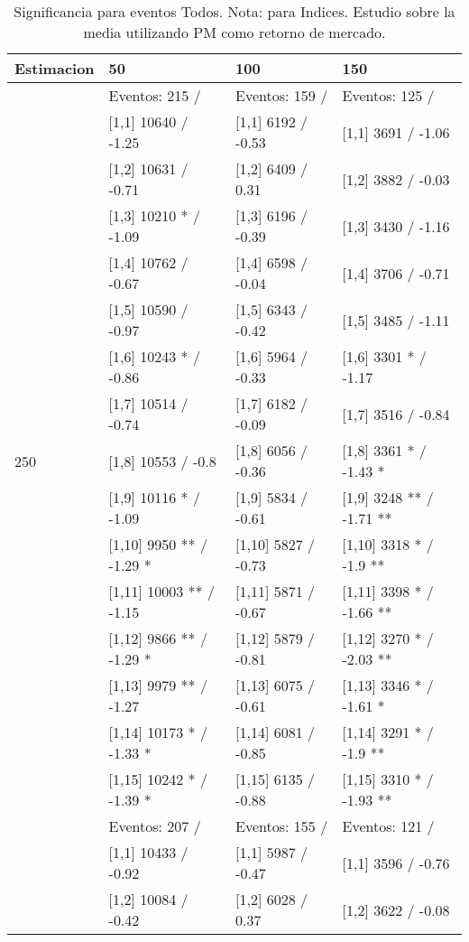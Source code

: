 \begin{table}

\caption{Significancia para eventos Todos. Nota: para Indices. Estudio sobre la media utilizando PM como retorno de mercado.}
\centering
\begin{tabular}[t]{llll}
\toprule
Estimacion & 50 & 100 & 150\\
\midrule
 & Eventos:  215 / & Eventos:  159 / & Eventos:  125 /\\
 & {}[1,1] 10640  / -1.25 & {}[1,1] 6192  / -0.53 & {}[1,1] 3691  / -1.06\\
 & {}[1,2] 10631  / -0.71 & {}[1,2] 6409  / 0.31 & {}[1,2] 3882  / -0.03\\
 & {}[1,3] 10210 * / -1.09 & {}[1,3] 6196  / -0.39 & {}[1,3] 3430  / -1.16\\
 & {}[1,4] 10762  / -0.67 & {}[1,4] 6598  / -0.04 & {}[1,4] 3706  / -0.71\\
\addlinespace
 & {}[1,5] 10590  / -0.97 & {}[1,5] 6343  / -0.42 & {}[1,5] 3485  / -1.11\\
 & {}[1,6] 10243 * / -0.86 & {}[1,6] 5964  / -0.33 & {}[1,6] 3301 * / -1.17\\
 & {}[1,7] 10514  / -0.74 & {}[1,7] 6182  / -0.09 & {}[1,7] 3516  / -0.84\\
250 & {}[1,8] 10553  / -0.8 & {}[1,8] 6056  / -0.36 & {}[1,8] 3361 * / -1.43 *\\
 & {}[1,9] 10116 * / -1.09 & {}[1,9] 5834  / -0.61 & {}[1,9] 3248 ** / -1.71 **\\
\addlinespace
 & {}[1,10] 9950 ** / -1.29 * & {}[1,10] 5827  / -0.73 & {}[1,10] 3318 * / -1.9 **\\
 & {}[1,11] 10003 ** / -1.15 & {}[1,11] 5871  / -0.67 & {}[1,11] 3398 * / -1.66 **\\
 & {}[1,12] 9866 ** / -1.29 * & {}[1,12] 5879  / -0.81 & {}[1,12] 3270 * / -2.03 **\\
 & {}[1,13] 9979 ** / -1.27 & {}[1,13] 6075  / -0.61 & {}[1,13] 3346 * / -1.61 *\\
 & {}[1,14] 10173 * / -1.33 * & {}[1,14] 6081  / -0.85 & {}[1,14] 3291 * / -1.9 **\\
\addlinespace
 & {}[1,15] 10242 * / -1.39 * & {}[1,15] 6135  / -0.88 & {}[1,15] 3310 * / -1.93 **\\
 & Eventos:  207 / & Eventos:  155 / & Eventos:  121 /\\
 & {}[1,1] 10433  / -0.92 & {}[1,1] 5987  / -0.47 & {}[1,1] 3596  / -0.76\\
 & {}[1,2] 10084  / -0.42 & {}[1,2] 6028  / 0.37 & {}[1,2] 3622  / -0.08\\

\end{tabular}
\end{table}
